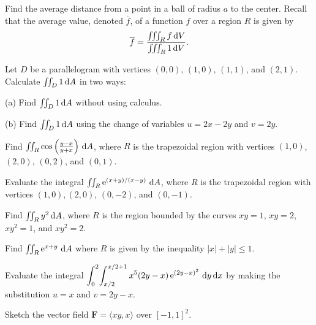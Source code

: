 \documentclass{watsonbook}
\begin{document}
\begin{aexercise}
  Find the average distance from a point in a ball of radius $a$ to
  the center. Recall that the average value, denoted $\overline{f}$,
  of a function $f$ over a region $R$ is given by
  \[
    \overline{f} = \frac{\iiint_R f \, {\mathrm{d}}V}{\iiint_R 1 \, {\mathrm{d}}V}.
  \]
\end{aexercise}



\begin{aexercise}
  Let $D$ be a parallelogram with vertices $(0,0)$, $(1,0)$, $(1,1)$,
  and $(2,1)$. Calculate $\iint_D 1\,\mathrm{d} A$ in two ways:

  (a) Find $\iint_D 1\,\mathrm{d} A$ without using calculus.

  (b) Find $\iint_D 1\,\mathrm{d} A$ using the change of variables $u = 2x - 2y$
  and $v=2y$.
\end{aexercise}

\begin{aexercise}
Find
$\iint_R \cos \left(\frac{y-x}{y+x}\right) \, {\mathrm{d}}A$, where $R$ is the
trapezoidal region with vertices $(1,0)$, $(2,0)$, $(0,2)$, and
$(0,1)$.
\end{aexercise}

\begin{aexercise}
  Evaluate the integral $\iint_R \operatorname{e}^{(x+y)/(x-y)} \, {\mathrm{d}}A$, where $R$ is
  the trapezoidal region with vertices $(1,0), (2,0)$, $(0,-2)$, and
  $(0,-1)$.
\end{aexercise}

\begin{aexercise}
  Find $\iint_R y^2 \, {\mathrm{d}}A$, where $R$ is the region bounded by the
  curves $xy = 1$, $xy = 2$, $xy^2 = 1$, and $xy^2 = 2$.
\end{aexercise}

\begin{aexercise}
  Find $\iint_R \operatorname{e}^{x+y} \, {\mathrm{d}}A$ where $R$ is given by the inequality
  $|x| + |y| \leq 1$.
\end{aexercise}

\begin{aexercise}
  Evaluate the integral
  $\displaystyle{\int_{0}^{2}\!\int_{x/2}^{x/2+1} x^5 (2y -
    x)\operatorname{e}^{(2y-x)^2} \,\mathrm{d}y\,\mathrm{d}x}$ by making the substitution $u = x$ and
  $v=2y-x$.
\end{aexercise}


\begin{aexercise}
  Sketch the vector field $\mathbf{F} =\langle xy, x\rangle$ over
  $[-1,1]^2$. 
\end{aexercise}
\end{document}
